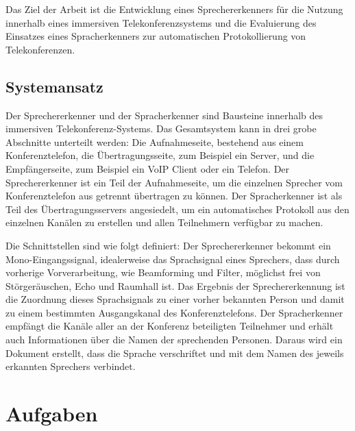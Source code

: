 \documentclass[lang=ngerman,inputenc=utf8,fontsize=10pt]{ldvarticle}
\begin{document}
Das Ziel der Arbeit ist die Entwicklung eines Sprechererkenners für die Nutzung innerhalb eines immersiven Telekonferenzsystems und die Evaluierung des Einsatzes eines Spracherkenners zur automatischen Protokollierung von Telekonferenzen.

\subsection*{Systemansatz}

Der Sprechererkenner und der Spracherkenner sind Bausteine innerhalb des immersiven Telekonferenz-Systems. Das Gesamtsystem kann in drei grobe Abschnitte unterteilt werden: Die Aufnahmeseite, bestehend aus einem Konferenztelefon, die Übertragungsseite, zum Beispiel ein Server, und die Empfängerseite, zum Beispiel ein VoIP Client oder ein Telefon. Der Sprechererkenner ist ein Teil der Aufnahmeseite, um die einzelnen Sprecher vom Konferenztelefon aus getrennt übertragen zu können. Der Spracherkenner ist als Teil des Übertragungsservers angesiedelt, um ein automatisches Protokoll aus den einzelnen Kanälen zu erstellen und allen Teilnehmern verfügbar zu machen.

Die Schnittstellen sind wie folgt definiert: Der Sprechererkenner bekommt ein Mono-Eingangssignal, idealerweise das Sprachsignal eines Sprechers, dass durch vorherige Vorverarbeitung, wie Beamforming und Filter, möglichst frei von Störgeräuschen, Echo und Raumhall ist. Das Ergebnis der Sprechererkennung ist die Zuordnung dieses Sprachsignals zu einer vorher bekannten Person und damit zu einem bestimmten Ausgangskanal des Konferenztelefons. Der Spracherkenner empfängt die Kanäle aller an der Konferenz beteiligten Teilnehmer und erhält auch Informationen über die Namen der sprechenden Personen. Daraus wird ein Dokument erstellt, dass die Sprache verschriftet und mit dem Namen des jeweils erkannten Sprechers verbindet.

\section{Aufgaben}
\end{document}
